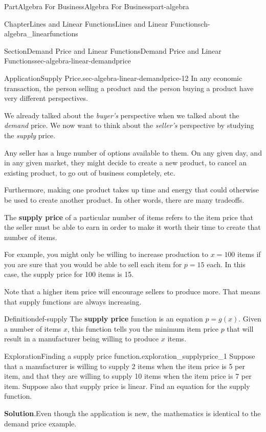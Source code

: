 \documentclass[oneside,10pt,]{tufte-book}
\newcommand{\blocktitlefont}{\relax}
\newcommand{\terminology}[1]{\textbf{#1}}
\numberwithin{equation}{chapter}
\begin{document}
\begin{partptx}{Part}{Algebra For Business}{}{Algebra For Business}{}{}{part-algebra}
\begin{chapterptx}{Chapter}{Lines and Linear Functions}{}{Lines and Linear Functions}{}{}{ch-algebra_linearfunctions}
\begin{sectionptx}{Section}{Demand Price and Linear Functions}{}{Demand Price and Linear Functions}{}{}{sec-algebra-linear-demandprice}
\begin{insight}{Application}{Supply Price.}{sec-algebra-linear-demandprice-12}
In any economic transaction, the person selling a product and the person  buying a product have very different perspectives.%
\par
We already talked about the \emph{buyer's} perspective when we talked about the \emph{demand} price.  We now want to think about the \emph{seller's} perspective by studying the \emph{supply} price.%
\par
Any seller has a huge number of options available to them.   On any given day, and in any given market, they might decide to create a new product, to cancel an existing product, to go out of business completely, etc.%
\par
Furthermore, making one product takes up time and energy that could otherwise be used to create another product.  In other words, there are many tradeoffs.%
\par
The \terminology{supply price} of a particular number of items refers to the item price that the seller must be able to earn in order to make it worth their time to create that number of items.%
\par
For example, you might only be willing to increase production to \(x=100\) items if you are sure that you would be able to sell each item for \(p=15\)\textdollar{} each.  In this case, the supply price for 100 items is 15\textdollar{}.%
\par
Note that a higher item price will encourage sellers to produce more.  That means that supply functions are always increasing.%
\end{insight}
\begin{definition}{Definition}{}{def-supply}%
The \terminology{supply price} function is an equation \(p = g(x)\). Given a number of items \(x\), this function tells you the minimum item price \(p\) that will result in a manufacturer being willing to produce \(x\) items.%
\end{definition}
\begin{exploration}{Exploration}{Finding a supply price function.}{exploration_supplyprice_1}%
Suppose that a manufacturer is willing to supply 2 items when the item price is 5 \textdollar{} per item, and that they are willing to supply 10 items when the item price is 7 \textdollar{} per item.  Suppose also that supply price is linear. Find an equation for the supply function.%
\par\smallskip%
\noindent\textbf{\blocktitlefont Solution}.\hypertarget{exploration_supplyprice_1-3}{}\quad{}Even though the application is new, the mathematics is identical to the demand price example.%

\end{exploration}
\end{sectionptx}
\end{chapterptx}
\end{partptx}
\end{document}
